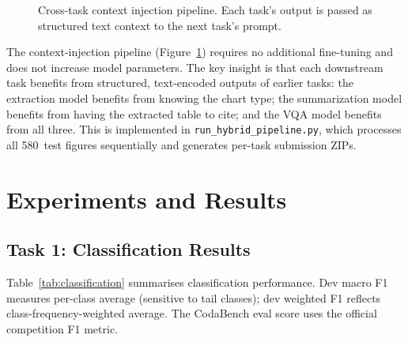 \documentclass[11pt]{tibop-article}
\begin{document}
\begin{figure}[h!]
  \caption{Cross-task context injection pipeline. Each task's output is
    passed as structured text context to the next task's prompt.}
  \label{fig:pipeline}
\end{figure}

The context-injection pipeline (Figure~\ref{fig:pipeline}) requires no
additional fine-tuning and does not increase model parameters.
The key insight is that each downstream task benefits from structured,
text-encoded outputs of earlier tasks: the extraction model benefits from
knowing the chart type; the summarization model benefits from having the
extracted table to cite; and the VQA model benefits from all three.
This is implemented in \texttt{run\_hybrid\_pipeline.py}, which processes all
580~test figures sequentially and generates per-task submission ZIPs.


\section{Experiments and Results}

\subsection{Task 1: Classification Results}

Table~\ref{tab:classification} summarises classification performance.
Dev macro F1 measures per-class average (sensitive to tail classes);
dev weighted F1 reflects class-frequency-weighted average.
The CodaBench eval score uses the official competition F1 metric.
\end{document}
